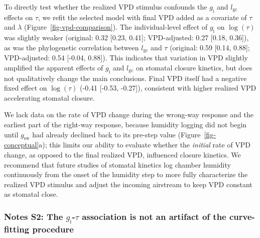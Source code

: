 \documentclass[
  letterpaper,
  DIV=11,
  numbers=noendperiod]{scrartcl}
\newcommand{\gcl}{$l_\mathrm{gc}$}
\newcommand{\gi}{$g_\mathrm{i}$}
\newcommand{\gsw}{$g_\mathrm{sw}$}
\begin{document}
To directly test whether the realized VPD stimulus confounds the \gi{}
and \gcl{} effects on \(\tau\), we refit the selected model with final
VPD added as a covariate of \(\tau\) and \(\lambda\)
(Figure~\ref{fig-vpd-comparison}). The individual-level effect of \gi{}
on \(\log \left( \tau \right)\) was slightly weaker (original: 0.32
{[}0.23, 0.41{]}; VPD-adjusted: 0.27 {[}0.18, 0.36{]}), as was the
phylogenetic correlation between \gcl{} and \(\tau\) (original: 0.59
{[}0.14, 0.88{]}; VPD-adjusted: 0.54 {[}-0.04, 0.88{]}). This indicates
that variation in VPD slightly amplified the apparent effects of \gi{}
and \gcl{} on stomatal closure kinetics, but does not qualitatively
change the main conclusions. Final VPD itself had a negative fixed
effect on \(\log \left( \tau \right)\) (-0.41 {[}-0.53, -0.27{]}),
consistent with higher realized VPD accelerating stomatal closure.

We lack data on the rate of VPD change during the wrong-way response and
the earliest part of the right-way response, because humidity logging
did not begin until \gsw{} had already declined back to its pre-step
value (Figure~\ref{fig-conceptual}a); this limits our ability to
evaluate whether the \emph{initial} rate of VPD change, as opposed to
the final realized VPD, influenced closure kinetics. We recommend that
future studies of stomatal kinetics log chamber humidity continuously
from the onset of the humidity step to more fully characterize the
realized VPD stimulus and adjust the incoming airstream to keep VPD
constant as stomatal close.

\newpage{}

\subsubsection{\texorpdfstring{Notes S2: The \gi{}-\(\tau\) association
is not an artifact of the curve-fitting
procedure}{Notes S2: The -\textbackslash tau association is not an artifact of the curve-fitting procedure}}\label{notes-s2-the--tau-association-is-not-an-artifact-of-the-curve-fitting-procedure}

\renewcommand{\thefigure}{\Alph{figure}}
\setcounter{figure}{0}
\end{document}
